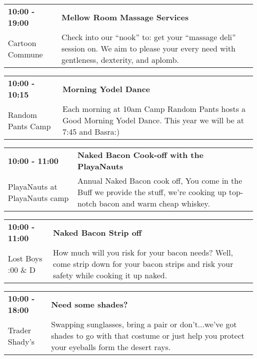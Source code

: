 \begin{tabular}{ p{1in} p{2.2in} }
    \textbf{10:00 - 19:00} & \textbf{Mellow Room Massage Services} \\
    Cartoon Commune \newline  & Check into our ``nook'' to: get your ``massage deli'' session on. We aim to please your every need with gentleness, dexterity, and aplomb. \\
    \hline 
\end{tabular}
    
\begin{tabular}{ p{1in} p{2.2in} }
    \textbf{10:00 - 10:15} & \textbf{Morning Yodel Dance} \\
    Random Pants Camp \newline  & Each morning at 10am Camp Random Pants hosts a Good Morning Yodel Dance. This year we will be at 7:45 and Basra:) \\
    \hline 
\end{tabular}
    
\begin{tabular}{ p{1in} p{2.2in} }
    \textbf{10:00 - 11:00} & \textbf{Naked Bacon Cook-off with the PlayaNauts} \\
    PlayaNauts \newline at PlayaNauts camp & Annual Naked Bacon cook off, You come in the Buff we provide the stuff, we're cooking up top-notch bacon and warm cheap whiskey. \\
    \hline 
\end{tabular}
    
\begin{tabular}{ p{1in} p{2.2in} }
    \textbf{10:00 - 11:00} & \textbf{Naked Bacon Strip off} \\
    Lost Boys \newline 4:00 \& D & How much will you risk for your bacon needs? Well, come strip down for your bacon strips and risk your safety while cooking it up naked. \\
    \hline 
\end{tabular}
    
\begin{tabular}{ p{1in} p{2.2in} }
    \textbf{10:00 - 18:00} & \textbf{Need some shades?} \\
    Trader Shady's \newline  & Swapping sunglasses, bring a pair or don't...we've got shades to go with that costume or just help you protect your eyeballs form the desert rays. \\
    \hline 
\end{tabular}
    
